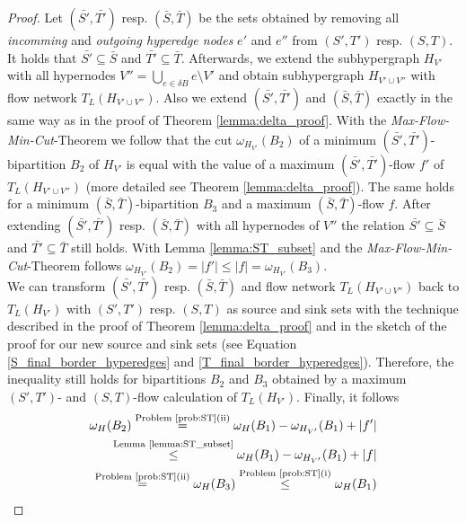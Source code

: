 \begin{proof}
Let $(\bar{S'},\bar{T'})$ resp. $(\bar{S},\bar{T})$ be the sets obtained by removing all
\emph{incomming} and \emph{outgoing hyperedge nodes} $e'$ and $e''$ from $(S',T')$ resp.
$(S,T)$. It holds that $\bar{S'} \subseteq \bar{S}$ and $\bar{T'} \subseteq \bar{T}$. Afterwards,
we extend the subhypergraph $H_{V'}$ with all hypernodes $V'' = \bigcup_{e \in \delta B} e \setminus V'$
and obtain subhypergraph $H_{V' \cup V''}$ with flow network $T_L(H_{V' \cup V''})$.
Also we extend $(\bar{S'},\bar{T'})$ and $(\bar{S},\bar{T})$ exactly in the same way as 
in the proof of Theorem \ref{lemma:delta_proof}. With the \emph{Max-Flow-Min-Cut}-Theorem 
\cite{ford1956maximal} we follow that the cut $\omega_{H_{V'}}(B_2)$ of 
a minimum $(\bar{S'},\bar{T'})$-bipartition $B_2$ of $H_{V'}$ is equal with the value of a 
maximum $(\bar{S'},\bar{T'})$-flow $f'$ of $T_L(H_{V' \cup V''})$ (more detailed see Theorem \ref{lemma:delta_proof}). 
The same holds for a minimum $(\bar{S},\bar{T})$-bipartition
$B_3$ and a maximum $(\bar{S},\bar{T})$-flow $f$. After extending $(\bar{S'},\bar{T'})$ 
resp. $(\bar{S},\bar{T})$ with all hypernodes of $V''$ the relation $\bar{S'} \subseteq \bar{S}$
and $\bar{T'} \subseteq \bar{T}$ still holds. With Lemma \ref{lemma:ST_subset} and the 
\emph{Max-Flow-Min-Cut}-Theorem follows $\omega_{H_{V'}}(B_2) = |f'| \le |f| = \omega_{H_{V'}}(B_3)$.\\
We can transform $(\bar{S'},\bar{T'})$ resp. $(\bar{S},\bar{T})$ and flow network $T_L(H_{V'\cup V''})$
back to $T_L(H_{V'})$ with $(S',T')$ resp. $(S,T)$ as source and sink sets
with the technique described in the proof of Theorem \ref{lemma:delta_proof} and in the sketch
of the proof for our new source and sink sets (see Equation \ref{S_final_border_hyperedges} and
\ref{T_final_border_hyperedges}). Therefore, the inequality still holds for bipartitions
$B_2$ and $B_3$ obtained by a maximum $(S',T')$- and $(S,T)$-flow calculation of $T_L(H_{V'})$.
Finally, it follows
\begin{align*}
\omega_H(B_2) \stackrel{\text{Problem \ref{prob:ST}(ii)}}{=} 
\omega_H(B_1) - \omega_{H_{V'}}(B_1) + |f'| \\
\stackrel{\text{Lemma \ref{lemma:ST_subset}}}{\le} \omega_H(B_1) - \omega_{H_{V'}}(B_1) + |f| \\
\stackrel{\text{Problem \ref{prob:ST}(ii)}}{=} \omega_H(B_3) \stackrel{\text{Problem \ref{prob:ST}(i)}}{\le} \omega_H(B_1)
\end{align*}
\end{proof}

